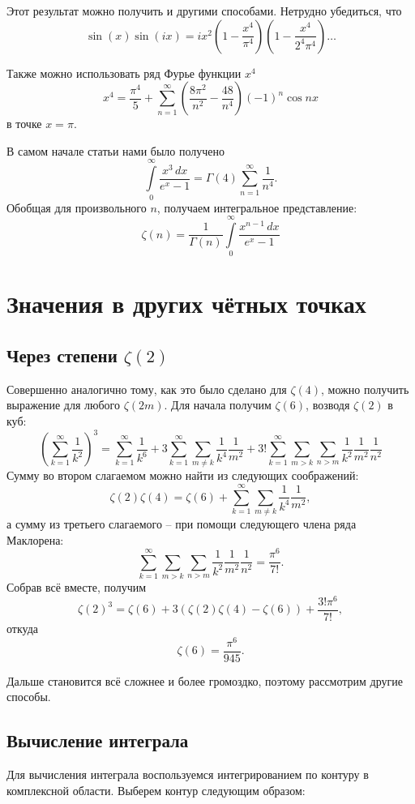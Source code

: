 \documentclass{ncc}
\begin{document}
Этот результат можно получить и другими способами. Нетрудно убедиться, что
\[
    \sin(x)\sin(ix) = ix^2\left(1-\frac{x^4}{\pi^4}\right)\left(1-\frac{x^4}{2^4\pi^4}\right)\ldots
\]

Также можно использовать ряд Фурье функции \( x^4 \)
\[
    x^4 = \frac{\pi^4}{5} + \sum\limits_{n=1}^\infty\left(\frac{8\pi^2}{n^2}-\frac{48}{n^4}\right)(-1)^n\cos nx
\]
в точке \( x=\pi \).

В самом начале статьи нами было получено
\[
    \int\limits_0^\infty \frac{x^3\,dx}{e^x - 1} = \Gamma(4)\sum\limits_{n=1}^\infty\frac{1}{n^4}.
\]
Обобщая для произвольного \( n \), получаем интегральное представление:
\[
    \zeta(n) = \frac{1}{\Gamma(n)}\int\limits_0^\infty \frac{x^{n-1}\,dx}{e^x - 1}
\]

\section{Значения в других чётных точках}

\subsection{Через степени \(\zeta(2)\)}
Совершенно аналогично тому, как это было сделано для \( \zeta(4) \), можно получить выражение для любого \( \zeta(2m) \). Для начала получим \( \zeta(6) \), возводя \( \zeta(2) \) в куб:
\[
    \left(\sum\limits_{k=1}^\infty \frac{1}{k^2}\right)^3 = \sum\limits_{k=1}^\infty \frac{1}{k^{6}} + 3\sum\limits_{k=1}^\infty\sum\limits_{m\ne k} \frac{1}{k^{4}}\frac{1}{m^2} + 3!\sum\limits_{k=1}^\infty\sum\limits_{m>k}\sum\limits_{n>m}\frac{1}{k^2}\frac{1}{m^2}\frac{1}{n^2}
\]
Сумму во втором слагаемом можно найти из следующих соображений:
\[
    \zeta(2)\zeta(4) = \zeta(6) + \sum\limits_{k=1}^\infty\sum\limits_{m\ne k} \frac{1}{k^{4}}\frac{1}{m^2},
\]
а сумму из третьего слагаемого -- при помощи следующего члена ряда Маклорена:
\[
    \sum\limits_{k=1}^\infty\sum\limits_{m>k}\sum\limits_{n>m}\frac{1}{k^2}\frac{1}{m^2}\frac{1}{n^2} = \frac{\pi^6}{7!}.
\]
Собрав всё вместе, получим
\[
    \zeta(2)^3 = \zeta(6) + 3(\zeta(2)\zeta(4)-\zeta(6)) + \frac{3!\pi^6}{7!},
\]
откуда
\[
    \zeta(6) = \frac{\pi^6}{945}.
\]

Дальше становится всё сложнее и более громоздко, поэтому рассмотрим другие способы.

\pagebreak
\subsection{Вычисление интеграла}
Для вычисления интеграла воспользуемся интегрированием по контуру в комплексной области. Выберем контур следующим образом:
\end{document}
